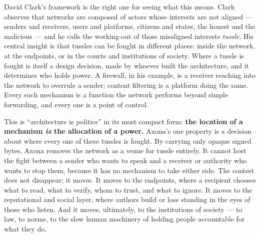 \documentclass[nobib,justified]{tufte-handout}
\begin{document}
David Clark's framework is the right one for seeing what this means. Clark
observes that networks are composed of actors whose interests are not aligned
--- senders and receivers, users and platforms, citizens and states, the honest
and the malicious --- and he calls the working-out of those misaligned interests
\emph{tussle}. His central insight is that tussles can be fought in different
places: inside the network, at the endpoints, or in the courts and institutions
of society. Where a tussle is fought is itself a design decision, made by whoever
built the architecture, and it determines who holds power. A firewall, in his
example, is a receiver reaching into the network to overrule a sender; content
filtering is a platform doing the same. Every such mechanism is a function the
network performs beyond simple forwarding, and every one is a point of control.

This is ``architecture is politics'' in its most compact form:
\textbf{the location of a mechanism \emph{is} the allocation of a power.}
Axona's one property is a decision about where every one of these tussles is
fought. By carrying only opaque signed bytes, Axona removes the network as a
venue for tussle entirely. It cannot host the fight between a sender who wants to
speak and a receiver or authority who wants to stop them, because it has no
mechanism to take either side. The contest does not disappear; it moves. It
moves to the endpoints, where a recipient chooses what to read, what to verify,
whom to trust, and what to ignore. It moves to the reputational and social
layer, where authors build or lose standing in the eyes of those who listen. And
it moves, ultimately, to the institutions of society --- to law, to norms, to
the slow human machinery of holding people accountable for what they do.
\end{document}
